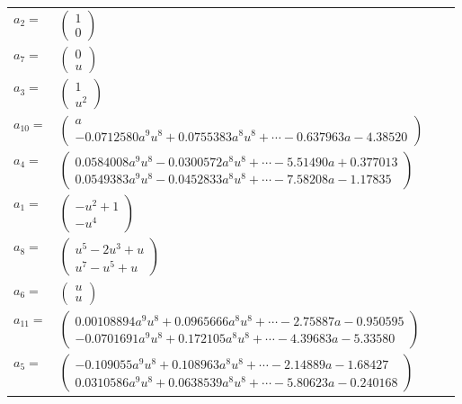 \documentclass[1p]{elsarticle_modified}
\theoremstyle{definition}
\begin{document}
\begin{tabular}{m{7pt} m{180pt} m{7pt} m{180pt} }
\flushright $a_{2}=$&$\begin{pmatrix}1\\0\end{pmatrix}$ \\
\flushright $a_{7}=$&$\begin{pmatrix}0\\u\end{pmatrix}$ \\
\flushright $a_{3}=$&$\begin{pmatrix}1\\u^2\end{pmatrix}$ \\
\flushright $a_{10}=$&$\begin{pmatrix}a\\-0.0712580 a^{9} u^{8}+0.0755383 a^{8} u^{8}+\cdots-0.637963 a-4.38520\end{pmatrix}$ \\
\flushright $a_{4}=$&$\begin{pmatrix}0.0584008 a^{9} u^{8}-0.0300572 a^{8} u^{8}+\cdots-5.51490 a+0.377013\\0.0549383 a^{9} u^{8}-0.0452833 a^{8} u^{8}+\cdots-7.58208 a-1.17835\end{pmatrix}$ \\
\flushright $a_{1}=$&$\begin{pmatrix}- u^2+1\\- u^4\end{pmatrix}$ \\
\flushright $a_{8}=$&$\begin{pmatrix}u^5-2 u^3+u\\u^7- u^5+u\end{pmatrix}$ \\
\flushright $a_{6}=$&$\begin{pmatrix}u\\u\end{pmatrix}$ \\
\flushright $a_{11}=$&$\begin{pmatrix}0.00108894 a^{9} u^{8}+0.0965666 a^{8} u^{8}+\cdots-2.75887 a-0.950595\\-0.0701691 a^{9} u^{8}+0.172105 a^{8} u^{8}+\cdots-4.39683 a-5.33580\end{pmatrix}$ \\
\flushright $a_{5}=$&$\begin{pmatrix}-0.109055 a^{9} u^{8}+0.108963 a^{8} u^{8}+\cdots-2.14889 a-1.68427\\0.0310586 a^{9} u^{8}+0.0638539 a^{8} u^{8}+\cdots-5.80623 a-0.240168\end{pmatrix}$ \\

\end{tabular}
\end{document}
